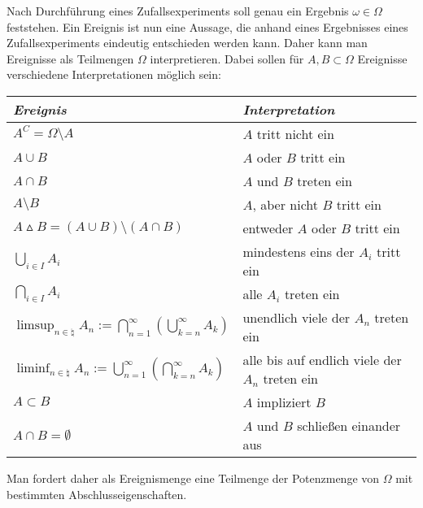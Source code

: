 \begin{Bem}
    Nach Durchführung eines Zufallsexperiments soll genau ein Ergebnis $\omega \in \Omega$
    feststehen.
    Ein Ereignis ist nun eine Aussage, die anhand eines Ergebnisses eines Zufallsexperiments
    eindeutig entschieden werden kann.
    Daher kann man Ereignisse als Teilmengen $\Omega$ interpretieren.
    Dabei sollen für $A, B \subset \Omega$ Ereignisse verschiedene Interpretationen möglich sein:

    \begin{tabular}{p{60mm}p{100mm}}
        \toprule
        \emph{Ereignis} &
        \emph{Interpretation}\\

        \midrule

        $A^C = \Omega \setminus A$ &
        $A$ tritt nicht ein \\

        $A \cup B$ &
        $A$ oder $B$ tritt ein \\

        $A \cap B$ &
        $A$ und $B$ treten ein \\

        $A \setminus B$ &
        $A$, aber nicht $B$ tritt ein \\

        $A \vartriangle B = (A \cup B) \setminus (A \cap B)$ &
        entweder $A$ oder $B$ tritt ein \\

        $\bigcup_{i \in I} A_i$ &
        mindestens eins der $A_i$ tritt ein \\

        $\bigcap_{i \in I} A_i$ &
        alle $A_i$ treten ein \\

        $\limsup_{n \in \natural} A_n :=
        \bigcap_{n=1}^\infty \left(\bigcup_{k=n}^\infty A_k\right)$ &
        unendlich viele der $A_n$ treten ein \\

        $\liminf_{n \in \natural} A_n :=
        \bigcup_{n=1}^\infty \left(\bigcap_{k=n}^\infty A_k\right)$ &
        alle bis auf endlich viele der $A_n$ treten ein \\

        $A \subset B$ &
        $A$ impliziert $B$ \\

        $A \cap B = \emptyset$ &
        $A$ und $B$ schließen einander aus \\

        \bottomrule
    \end{tabular}

    Man fordert daher als Ereignismenge eine Teilmenge der Potenzmenge von $\Omega$ mit bestimmten
    Abschlusseigenschaften.
\end{Bem}

